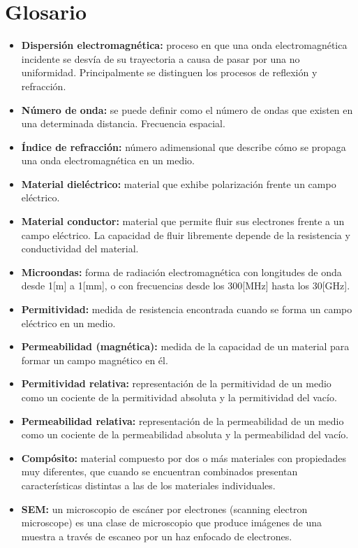 \documentclass[11pt]{article}
\begin{document}
\section*{Glosario}
\begin{itemize}
	\renewcommand\labelitemi{--}
	\item \textbf{Dispersión electromagnética:} proceso en que una onda electromagnética incidente se desvía de su trayectoria a causa de pasar por una no uniformidad. Principalmente se distinguen los procesos de reflexión y refracción. 
	\item \textbf{Número de onda:} se puede definir como el número de ondas que existen en una determinada distancia. Frecuencia espacial.
	\item \textbf{Índice de refracción:} número adimensional que describe cómo se propaga una onda electromagnética en un medio.
	\item \textbf{Material dieléctrico:} material que exhibe polarización frente un campo eléctrico. 
	\item \textbf{Material conductor:} material que permite fluir sus electrones frente a un campo eléctrico. La capacidad de fluir libremente depende de la resistencia y conductividad del material.
	\item \textbf{Microondas:} forma de radiación electromagnética con longitudes de onda desde 1[m] a 1[mm], o con frecuencias desde los 300[MHz] hasta los 30[GHz].
	\item \textbf{Permitividad:} medida de resistencia encontrada cuando se forma un campo eléctrico en un medio.
	\item \textbf{Permeabilidad (magnética):} medida de la capacidad de un material para formar un campo magnético en él.
	\item \textbf{Permitividad relativa:} representación de la permitividad de un medio como un cociente de la permitividad absoluta y la permitividad del vacío. 
	\item \textbf{Permeabilidad relativa:} representación de la permeabilidad de un medio como un cociente de la permeabilidad absoluta y la permeabilidad del vacío. 
	\item \textbf{Compósito:} material compuesto por dos o más materiales con propiedades muy diferentes, que cuando se encuentran combinados presentan características distintas a las de los materiales individuales.  
	\item \textbf{SEM:} un microscopio de escáner por electrones (scanning electron microscope) es una clase de microscopio que produce imágenes de una muestra a través de escaneo por un haz enfocado de electrones.

\end{itemize}
\end{document}
